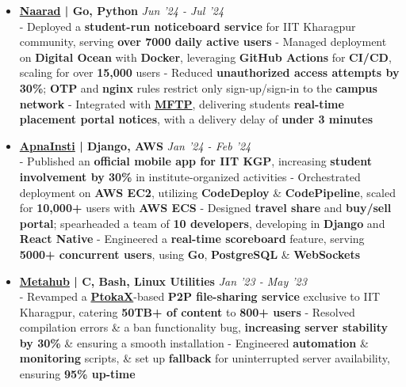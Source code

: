 \documentclass[a4paper,10pt]{extarticle} %
\begin{document}
\begin{itemize}[leftmargin=0.55cm, rightmargin=0.2cm, label={\Large\textbullet}]

 \item \textbf{\href{https://naarad.metakgp.org}{Naarad} | Go, Python} \hfill{\textit{Jun '24 - Jul '24}} \\
- Deployed a \textbf{student-run noticeboard service} for IIT Kharagpur community, serving \textbf{over 7000 daily active users} \newline
- Managed deployment on \textbf{Digital Ocean} with \textbf{Docker}, leveraging \textbf{GitHub Actions} for \textbf{CI/CD}, scaling for over \textbf{15,000} users \newline
- Reduced \textbf{unauthorized access attempts by 30\%}; \textbf{OTP} and \textbf{nginx} rules restrict only sign-up/sign-in to the \textbf{campus network}  \newline
- Integrated with \href{https://github.com/metakgp/mftp}{\textbf{MFTP}}, delivering students \textbf{real-time placement portal notices}, with a delivery delay of \textbf{under 3 minutes}

 \item \textbf{{\href{https://play.google.com/store/apps/details?id=com.apnainsti&pli=1}{ApnaInsti}} | Django, AWS} \hfill{\textit{Jan '24 - Feb '24}} \\
- Published an \textbf{official mobile app for IIT KGP}, increasing \textbf{student involvement by 30\%} in institute-organized activities \newline
- Orchestrated deployment on \textbf{AWS EC2}, utilizing \textbf{CodeDeploy} \& \textbf{CodePipeline}, scaled for \textbf{10,000+} users with \textbf{AWS ECS} \newline
- Designed \textbf{travel share} and \textbf{buy/sell portal}; spearheaded a team of \textbf{10 developers}, developing in \textbf{Django} and \textbf{React Native} \newline
- Engineered a \textbf{real-time scoreboard} feature, serving \textbf{5000+ concurrent users}, using \textbf{Go}, \textbf{PostgreSQL} \& \textbf{WebSockets}

\item \textbf{{\href{https://github.com/proffapt/Metahub}{Metahub}} | C, Bash, Linux Utilities} \hfill{\textit{Jan '23 - May '23}} \\
- Revamped a \href{http://www.ptokax.org/}{\textbf{PtokaX}}-based \textbf{P2P file-sharing service} exclusive to IIT Kharagpur, catering \textbf{50TB+ of content} to \textbf{800+ users} \newline
- Resolved compilation errors \& a ban functionality bug, \textbf{increasing server stability by 30\%} \& ensuring a smooth installation \newline
- Engineered \textbf{automation} \& \textbf{monitoring} scripts, \& set up \textbf{fallback} for uninterrupted server availability, ensuring \textbf{95\% up-time}


\end{itemize}
\end{document}
